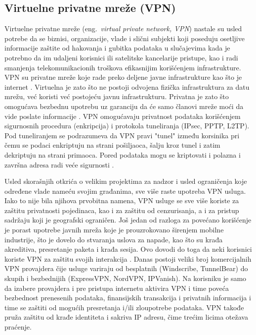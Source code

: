\documentclass[a4paper]{article}
\begin{document}
\subsection{Virtuelne privatne mreže (VPN)}
\label{subsec:vpn}

Virtuelne privatne mreže (eng.~{\em virtual private network, VPN}) nastale su usled potrebe da se biznisi, organizacije, vlade i slični subjekti koji poseduju osetljive informacije zaštite od hakovanja i gubitka podataka u slučajevima kada je potrebno da im udaljeni korisnici ili satelitske kancelarije pristupe, kao i radi smanjenja telekomunikacionih troškova efikasnijim korišćenjem infrastrukture. VPN su privatne mreže koje rade preko deljene javne infrastrukture kao što je internet \cite{vpn2}. Virtuelna je zato što ne postoji odvojena fizička infrastruktura za datu mrežu, već koristi već postojeću javnu infrastrukturu. Privatna je zato što  omogućava bezbednu upotrebu uz garanciju da će samo članovi mreže moći da vide poslate informacije \cite{vpn3}. VPN omogućavaju privatnost podataka korišćenjem sigurnosnih procedura (enkripcija) i protokola tuneliranja (IPsec, PPTP, L2TP). Pod tuneliranjem se podrazumeva da VPN pravi "tunel" između korsinika pri čemu se podaci enkriptuju na strani pošiljaoca, šalju kroz tunel i zatim dekriptuju na strani primaoca. Pored podataka mogu se kriptovati i polazna i završna adresa radi veće sigurnosti \cite{vpn4}. 
\par Usled skorašnjih otkrića o velikim projektima za nadzor i usled ograničenja koje određene vlade nameću svojim građanima, sve više raste upotreba VPN usluga. Iako to nije bila njihova prvobitna namena, VPN usluge se sve više koriste za zaštitu privatnosti pojedinaca, kao i za zaštitu od cenzurisanja, a i za pristup sadržaju koji je geografski ograničen. Još jedan od razloga za povećano korišćenje je porast upotrebe javnih mreža koje je prouzrokovano širenjem mobilne industrije, što je dovelo do stvaranja uslova za napade, kao što su krađa akreditiva, presretanje paketa i krađa sesija. Ovo dovodi do toga da neki korisnici koriste VPN za zaštitu svojih interakcija \cite{vpn5}. Danas postoji veliki broj komercijalnih VPN provajdera čije usluge variraju od besplatnih (Windscribe, TunnelBear) do skupih i bezbednijih (ExpressVPN, NordVPN, IPVanish). Na korisniku je samo da izabere provajdera i pre pristupa internetu aktivira VPN i time poveća bezbednost prenesenih podataka, finansijskih transakcija i privatnih informacija i time se zaštiti od mogućih presretanja i/ili zloupotrebe podataka. VPN takođe pruža zaštitu od krađe identiteta i sakriva IP adresu, čime trećim licima otežava praćenje. 
\end{document}
